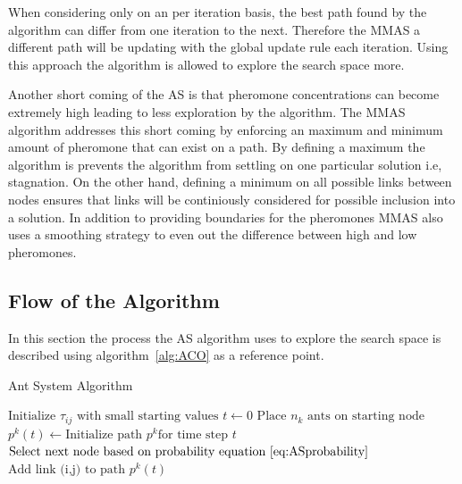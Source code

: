 When considering only on an per iteration basis, the best path found by the algorithm can differ from one iteration to the next\cite{FundamentalSwarm}. Therefore the \gls{MMAS} a different path will be updating with the global update rule each iteration\cite{FundamentalSwarm}. Using this approach the algorithm is allowed to explore the search space more\cite{FundamentalSwarm}.

Another short coming of the \gls{AS} is that pheromone concentrations can become extremely high leading to less exploration by the algorithm\cite{FundamentalSwarm}. The \gls{MMAS} algorithm addresses this short coming by enforcing an maximum and minimum amount of pheromone that can exist on a path\cite{FundamentalSwarm}. By defining a maximum the algorithm is prevents the algorithm from settling on one particular solution i.e, stagnation\cite{FundamentalSwarm}. On the other hand, defining a minimum on all possible links between nodes ensures that links will be continiously considered for possible inclusion into a solution\cite{FundamentalSwarm}. In addition to providing boundaries for the pheromones \gls{MMAS} also uses a smoothing strategy to even out the difference between high and low pheromones\cite{FundamentalSwarm}.

\subsection{Flow of the Algorithm}
In this section the process the \gls{AS} algorithm uses to explore the search space is described using algorithm~\ref{alg:ACO} as a reference point.
\begin{algorithm}[H]
\caption{Ant System Algorithm~\cite{CompuIntelligenceIntro}}
\label{alg:ACO}
	\begin{algorithmic}[1]
	\State$\text{Initialize $\tau_{ij}$ with small starting values}$
	\State$t \leftarrow 0$
	\State$\text{Place $n_k$ ants on starting node}$
			\State$p^k(t) \leftarrow \text{Initialize path } p^k \text{for time step } t$
			\Repeat
				\State$\text{Select next node based on probability equation~\ref{eq:ASprobability}}$
				\State$\text{Add link (i,j) to path } p^k(t)$
	\end{algorithmic}
\addtocounter{algorithm}{-1}
\end{algorithm}

